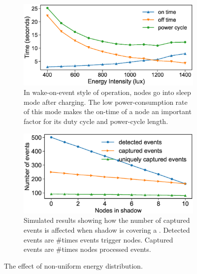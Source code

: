 \begin{figure}
    \begin{subfigure}{0.49\columnwidth}
        \includegraphics[width=\textwidth]{figures/BatterylessNodesDutyCycles_Sleep_mode}
        \caption{In wake-on-event style of operation, nodes go into sleep
	mode after charging. The low power-consumption rate of this mode makes
	the on-time of a node an important factor for its duty cycle and
	power-cycle length.}
        \label{fig:differentEnergyIntensity}
    \end{subfigure}\hfill
    \begin{subfigure}{0.49\columnwidth}
        \includegraphics[width=\textwidth]{figures/different_energy_intensity}
        \caption{Simulated results showing how the number of captured events is affected when shadow is covering a \cis. Detected events are \#times events trigger nodes. Captured events are \#times nodes processed events.}
        \label{fig:sim:differentEnergyIntensity}
    \end{subfigure}
    \caption{The effect of non-uniform energy distribution.}
    \label{fig:pwrCycleVSEnergyIntensity}
\end{figure}
